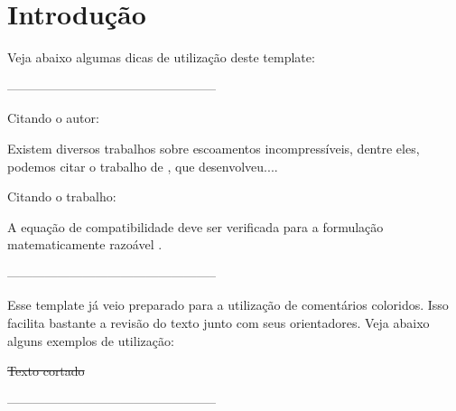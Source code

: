 \chapter{Introdução}



Veja abaixo algumas dicas de utilização deste template:

--------------------------------------------------



Citando o autor:

Existem diversos trabalhos sobre escoamentos incompressíveis, dentre eles, podemos citar o trabalho de , que desenvolveu....


Citando o trabalho:

A equação de compatibilidade deve ser verificada para a formulação matematicamente razoável \cite{Guermond:2003}. 


--------------------------------------------------

Esse template já veio preparado para a utilização de comentários coloridos. Isso facilita bastante a revisão do texto junto com seus orientadores. Veja abaixo alguns exemplos de utilização:









\sout{Texto cortado}

--------------------------------------------------

